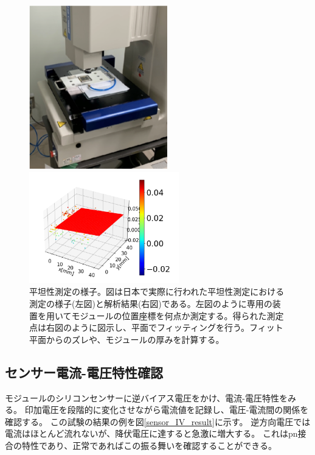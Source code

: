 \begin{figure}[bpt]\centering
  \begin{minipage}{0.4\hsize}
    \begin{center}
    \includegraphics[width=60mm]{./Metrology_setup.png}
    \end{center}
  \end{minipage}
  \begin{minipage}{0.4\hsize}
    \begin{center}
    \includegraphics[width=65mm]{./Metrology_analysis.png}
    \end{center}
  \end{minipage}
  \caption[平坦性測定の様子。]{平坦性測定の様子。図は日本で実際に行われた平坦性測定における測定の様子(左図)と解析結果(右図)である。左図のように専用の装置を用いてモジュールの位置座標を何点か測定する。得られた測定点は右図のように図示し、平面でフィッティングを行う。フィット平面からのズレや、モジュールの厚みを計算する。}
  \label{Metrology_overview}
\end{figure}

\clearpage
\subsection{センサー電流-電圧特性確認}
モジュールのシリコンセンサーに逆バイアス電圧をかけ、電流-電圧特性をみる。
印加電圧を段階的に変化させながら電流値を記録し、電圧-電流間の関係を確認する。
この試験の結果の例を図\ref{sensor_IV_result}に示す。
逆方向電圧では電流はほとんど流れないが、降伏電圧に達すると急激に増大する。
これはpn接合の特性\cite{2-1}であり、正常であればこの振る舞いを確認することができる。

